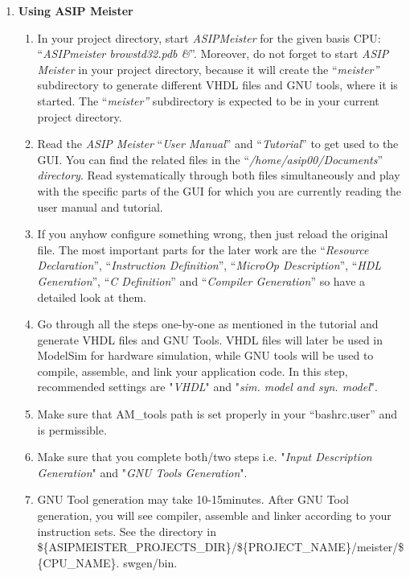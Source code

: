 \documentclass[
]{article}
\begin{document}
\begin{enumerate}
\def\labelenumi{\arabic{enumi}.}
\setcounter{enumi}{2}
\item
  \textbf{Using ASIP Meister}

  \begin{enumerate}
  \def\labelenumii{\arabic{enumii}.}
  \item
    In your project directory, start \emph{ASIPMeister} for the given
    basis CPU: ``\emph{ASIPmeister browstd32.pdb \&}''. Moreover, do not
    forget to start \emph{ASIP Meister} in your project directory,
    because it will create the ``\emph{meister''} subdirectory to
    generate different VHDL files and GNU tools, where it is started.
    The ``\emph{meister''} subdirectory is expected to be in your
    current project directory.
  \item
    Read the \emph{ASIP Meister} ``\emph{User Manual}'' and
    ``\emph{Tutorial}'' to get used to the GUI. You can find the related
    files in the ``\emph{/home/asip00/Documents}'' \emph{directory}.
    Read systematically through both files simultaneously and play with
    the specific parts of the GUI for which you are currently reading
    the user manual and tutorial.
  \item
    If you anyhow configure something wrong, then just reload the
    original file. The most important parts for the later work are the
    ``\emph{Resource Declaration}'', ``\emph{Instruction Definition}'',
    ``\emph{MicroOp Description}'', ``\emph{HDL Generation}'', ``\emph{C
    Definition}'' and ``\emph{Compiler Generation}'' so have a detailed
    look at them.
  \item
    Go through all the steps one-by-one as mentioned in the tutorial and
    generate VHDL files and GNU Tools. VHDL files will later be used in
    ModelSim for hardware simulation, while GNU tools will be used to
    compile, assemble, and link your application code. In this step,
    recommended settings are "\emph{VHDL}" and "\emph{sim. model and
    syn. model}".
  \item
    Make sure that AM\_tools path is set properly in your
    ``bashrc.user'' and is permissible.
  \item
    Make sure that you complete both/two steps i.e. "\emph{Input
    Description Generation}" and "\emph{GNU Tools Generation}".
  \item
    GNU Tool generation may take 10-15minutes. After GNU Tool
    generation, you will see compiler, assemble and linker according to
    your instruction sets. See the directory in
    \$\{ASIPMEISTER\_PROJECTS\_DIR\}/\$\{PROJECT\_NAME\}/meister/\$\{CPU\_NAME\}.
    swgen/bin.
  \end{enumerate}
\end{enumerate}
\end{document}
